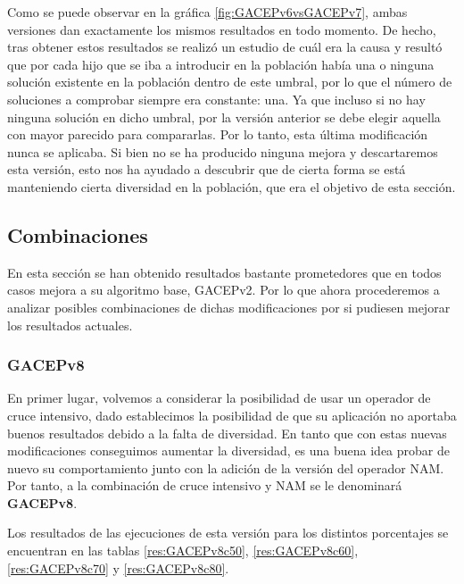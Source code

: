 Como se puede observar en la gráfica \ref{fig:GACEPv6vsGACEPv7}, ambas versiones dan exactamente los mismos resultados en todo momento. 
De hecho, tras obtener estos resultados se realizó un estudio de cuál era la causa y resultó que por cada hijo que se iba a introducir en la población había una o ninguna solución existente en la población dentro de este umbral, por lo que el número de soluciones a comprobar siempre era constante: una. 
Ya que incluso si no hay ninguna solución en dicho umbral, por la versión anterior se debe elegir aquella con mayor parecido para compararlas. 
Por lo tanto, esta última modificación nunca se aplicaba. 
Si bien no se ha producido ninguna mejora y descartaremos esta versión, esto nos ha ayudado a descubrir que de cierta forma se está manteniendo cierta diversidad en la población, que era el objetivo de esta sección. 

\subsection{Combinaciones}


En esta sección se han obtenido resultados bastante prometedores que en todos casos mejora a su algoritmo base, GACEPv2. 
Por lo que ahora procederemos a analizar posibles combinaciones de dichas modificaciones por si pudiesen mejorar los resultados actuales.%

\subsubsection{GACEPv8}

En primer lugar, volvemos a considerar la posibilidad de usar un operador de cruce intensivo, dado establecimos la posibilidad de que su aplicación no aportaba buenos resultados debido a la falta de diversidad. 
En tanto que con estas nuevas modificaciones conseguimos aumentar la diversidad, es una buena idea probar de nuevo su comportamiento junto con la adición de la versión del operador NAM. 
Por tanto, a la combinación de cruce intensivo y NAM se le denominará \textbf{GACEPv8}.

Los resultados de las ejecuciones de esta versión para los distintos porcentajes se encuentran en las tablas \ref{res:GACEPv8c50}, \ref{res:GACEPv8c60}, \ref{res:GACEPv8c70} y \ref{res:GACEPv8c80}.

